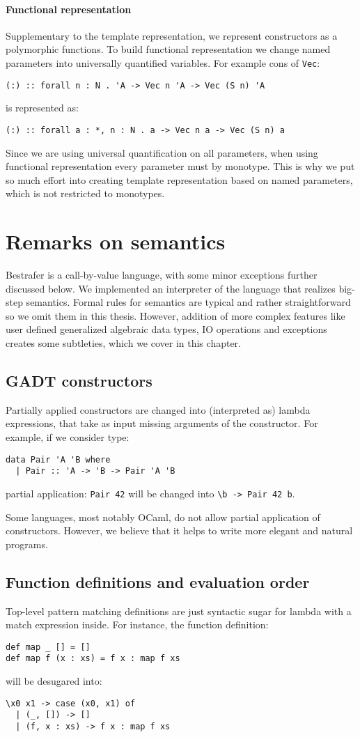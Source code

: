 \documentclass[declaration,shortabstract,english]{iithesis}
\begin{document}
\subsubsection*{Functional representation}
Supplementary to the template representation, we represent constructors as a polymorphic functions.
To build functional representation we change named parameters into universally quantified variables.
For example cons of \verb+Vec+:
\begin{verbatim}
(:) :: forall n : N . 'A -> Vec n 'A -> Vec (S n) 'A
\end{verbatim}
is represented as:
\begin{verbatim}
(:) :: forall a : *, n : N . a -> Vec n a -> Vec (S n) a
\end{verbatim}
Since we are using universal quantification on all parameters,
when using functional representation every parameter must by monotype.
This is why we put so much effort into creating template representation based on named
parameters, which is not restricted to monotypes.

\chapter{Remarks on semantics}
Bestrafer is a call-by-value language, with some minor exceptions further discussed below.
We implemented an interpreter of the language that realizes big-step semantics.
Formal rules for semantics are typical and rather straightforward so we omit them in this thesis. However, addition
of more complex features like user defined generalized algebraic data types, IO operations and exceptions creates
some subtleties, which we cover in this chapter.
\section{GADT constructors}
Partially applied constructors are changed into (interpreted as) lambda expressions, that take as input missing arguments of the constructor.
For example, if we consider type:
\begin{verbatim}
data Pair 'A 'B where
  | Pair :: 'A -> 'B -> Pair 'A 'B
\end{verbatim}
partial application: \verb+Pair 42+ will be changed into \verb+\b -> Pair 42 b+.

Some languages, most notably OCaml, do not allow partial application of constructors.
However, we believe that it helps to write more elegant and natural programs.
\section{Function definitions and evaluation order}
Top-level pattern matching definitions are just syntactic sugar for lambda with a match expression inside.
For instance, the function definition:
\begin{verbatim}
def map _ [] = []
def map f (x : xs) = f x : map f xs
\end{verbatim}
will be desugared into:
\begin{verbatim}
\x0 x1 -> case (x0, x1) of
  | (_, []) -> []
  | (f, x : xs) -> f x : map f xs
\end{verbatim}
\end{document}
